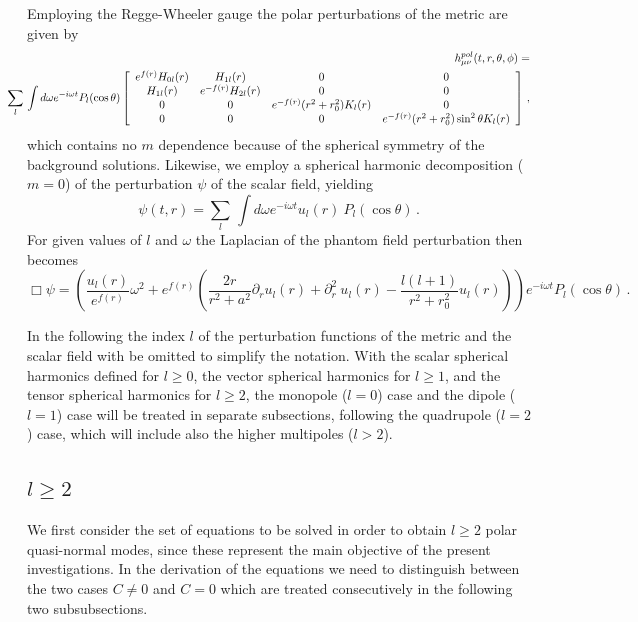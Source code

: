 \documentclass[a4paper,12pt]{article}
\def \nn {\nonumber}
\newcommand{\be}{\begin{equation}}
\newcommand{\ee}{\end{equation}}
\newcommand{\bea}{\begin{eqnarray}}
\newcommand{\eea}{\end{eqnarray}}
\begin{document}
Employing the Regge-Wheeler gauge \cite{Regge:1957td} the polar perturbations of the metric are given by
    \bea 
    && \hspace*{-1.0cm}
    h^{pol}_{\mu\nu}(t,r,\theta,\phi)= \\
    && \hspace*{-1.0cm}
     \sum\limits_{l}\,\int d\omega
    e^{-i\omega t}P_l(\cos\theta)\left[\begin{array}{cccc}
    e^{f(r)}H_{0l}(r)&H_{1l}(r)&0&0\\
    H_{1l}(r)&e^{-f(r)}H_{2l}(r)&0&0\\
    0&0&e^{-f(r)}(r^2+r_0^2)K_{l}(r)&0\nn\\
    0&0&0&e^{-f(r)}(r^2+r_0^2)\sin^2\theta K_{l}(r)
    \end{array}\right]\,, 
    \eea
    which contains no $m$ dependence because of the spherical symmetry of the background solutions.
Likewise, we employ a spherical harmonic decomposition ($m=0$) of the perturbation $\psi$ of the scalar field, yielding 
    \be 
    \psi(t,r)= \sum\limits_{l}\,\int d\omega
    e^{-i\omega t}u_l(r)\ P_l(\cos\theta)\,.
    \ee 
For given values of $l$ and $\omega$ 
the Laplacian of the phantom field perturbation then becomes
    \be
   \Box\psi=\left(\frac{u_l(r)}{e^{f(r)}} \omega^2
   +e^{f(r)}\left(\frac{2r}{r^2+a^2}\partial_ru_l(r)+\partial^2_r\ u_l(r)-\frac{l(l+1)}{r^2+r_0^2}u_l(r)\right)\right)e^{-i\omega t}P_l(\cos\theta) \,.
   \label{Laplacian_general-psi}
   \ee
   
In the following the index $l$ of the perturbation functions of the metric and the scalar field with be omitted to simplify the notation.
With the scalar spherical harmonics defined for $l\ge 0$, the vector spherical harmonics for $l\ge 1$, and the tensor spherical harmonics for $l\ge 2$, the monopole ($l=0$) case and the dipole ($l=1$) case will be treated in separate subsections, following the quadrupole ($l=2$) case, which will include also the higher multipoles ($l>2$).


\subsection{$l\ge 2$}

 
%

We first consider the set of equations to be solved in order to obtain $l\ge 2$ polar quasi-normal modes, since these represent the main objective of the present investigations.
In the derivation of the equations %
we need to distinguish between the two cases $C\neq 0$ and $C=0$ which are treated consecutively in the following two subsubsections.
%
\end{document}
